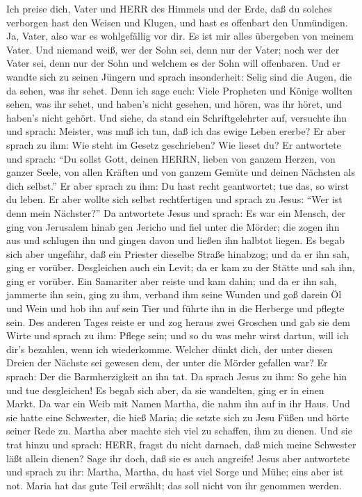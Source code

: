 Ich preise dich, Vater und HERR des Himmels und der Erde, daß du solches
verborgen hast den Weisen und Klugen, und hast es offenbart den
Unmündigen. Ja, Vater, also war es wohlgefällig vor dir. 
Es ist mir alles übergeben von meinem Vater. Und niemand weiß, wer der
Sohn sei, denn nur der Vater; noch wer der Vater sei, denn nur der Sohn
und welchem es der Sohn will offenbaren.  Und er wandte
sich zu seinen Jüngern und sprach insonderheit: Selig sind die Augen,
die da sehen, was ihr sehet.  Denn ich sage euch: Viele
Propheten und Könige wollten sehen, was ihr sehet, und haben's nicht
gesehen, und hören, was ihr höret, und haben's nicht gehört.
 Und siehe, da stand ein Schriftgelehrter auf, versuchte
ihn und sprach: Meister, was muß ich tun, daß ich das ewige Leben
ererbe?  Er aber sprach zu ihm: Wie steht im Gesetz
geschrieben? Wie lieset du?  Er antwortete und sprach: ``Du
sollst Gott, deinen HERRN, lieben von ganzem Herzen, von ganzer Seele,
von allen Kräften und von ganzem Gemüte und deinen Nächsten als dich
selbst.''  Er aber sprach zu ihm: Du hast recht
geantwortet; tue das, so wirst du leben.  Er aber wollte
sich selbst rechtfertigen und sprach zu Jesus: ``Wer ist denn mein
Nächster?''  Da antwortete Jesus und sprach: Es war ein
Mensch, der ging von Jerusalem hinab gen Jericho und fiel unter die
Mörder; die zogen ihn aus und schlugen ihn und gingen davon und ließen
ihn halbtot liegen.  Es begab sich aber ungefähr, daß ein
Priester dieselbe Straße hinabzog; und da er ihn sah, ging er vorüber.
 Desgleichen auch ein Levit; da er kam zu der Stätte und
sah ihn, ging er vorüber.  Ein Samariter aber reiste und
kam dahin; und da er ihn sah, jammerte ihn sein,  ging zu
ihm, verband ihm seine Wunden und goß darein Öl und Wein und hob ihn auf
sein Tier und führte ihn in die Herberge und pflegte sein. 
Des anderen Tages reiste er und zog heraus zwei Groschen und gab sie dem
Wirte und sprach zu ihm: Pflege sein; und so du was mehr wirst dartun,
will ich dir's bezahlen, wenn ich wiederkomme.  Welcher
dünkt dich, der unter diesen Dreien der Nächste sei gewesen dem, der
unter die Mörder gefallen war?  Er sprach: Der die
Barmherzigkeit an ihn tat. Da sprach Jesus zu ihm: So gehe hin und tue
desgleichen!  Es begab sich aber, da sie wandelten, ging er
in einen Markt. Da war ein Weib mit Namen Martha, die nahm ihn auf in
ihr Haus.  Und sie hatte eine Schwester, die hieß Maria;
die setzte sich zu Jesu Füßen und hörte seiner Rede zu. 
Martha aber machte sich viel zu schaffen, ihm zu dienen. Und sie trat
hinzu und sprach: HERR, fragst du nicht darnach, daß mich meine
Schwester läßt allein dienen? Sage ihr doch, daß sie es auch angreife!
 Jesus aber antwortete und sprach zu ihr: Martha, Martha,
du hast viel Sorge und Mühe;  eins aber ist not. Maria hat
das gute Teil erwählt; das soll nicht von ihr genommen werden.

